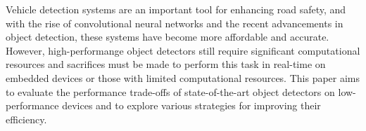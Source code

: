 


Vehicle detection systems are an important tool for enhancing road safety, and
with the rise of convolutional neural networks and the recent advancements in
object detection, these systems have become more affordable and accurate.
However, high-performange object detectors still require significant
computational resources and sacrifices must be made to perform this task in
real-time on embedded devices or those with limited computational resources.
This paper aims to evaluate the performance trade-offs of state-of-the-art
object detectors on low-performance devices and to explore various strategies
for improving their efficiency.

